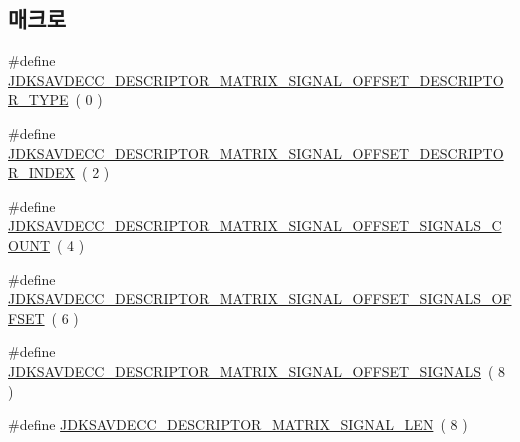 \subsection*{매크로}
\begin{DoxyCompactItemize}
\item 
\#define \hyperlink{group__descriptor__matrix__signal_ga83a98e456370c0fed71a54be9c65c89a}{J\+D\+K\+S\+A\+V\+D\+E\+C\+C\+\_\+\+D\+E\+S\+C\+R\+I\+P\+T\+O\+R\+\_\+\+M\+A\+T\+R\+I\+X\+\_\+\+S\+I\+G\+N\+A\+L\+\_\+\+O\+F\+F\+S\+E\+T\+\_\+\+D\+E\+S\+C\+R\+I\+P\+T\+O\+R\+\_\+\+T\+Y\+PE}~( 0 )
\item 
\#define \hyperlink{group__descriptor__matrix__signal_gad878b96f01d040970dd238c7bb1ecad5}{J\+D\+K\+S\+A\+V\+D\+E\+C\+C\+\_\+\+D\+E\+S\+C\+R\+I\+P\+T\+O\+R\+\_\+\+M\+A\+T\+R\+I\+X\+\_\+\+S\+I\+G\+N\+A\+L\+\_\+\+O\+F\+F\+S\+E\+T\+\_\+\+D\+E\+S\+C\+R\+I\+P\+T\+O\+R\+\_\+\+I\+N\+D\+EX}~( 2 )
\item 
\#define \hyperlink{group__descriptor__matrix__signal_gafe92108e812209dc99fffab8a2e98c45}{J\+D\+K\+S\+A\+V\+D\+E\+C\+C\+\_\+\+D\+E\+S\+C\+R\+I\+P\+T\+O\+R\+\_\+\+M\+A\+T\+R\+I\+X\+\_\+\+S\+I\+G\+N\+A\+L\+\_\+\+O\+F\+F\+S\+E\+T\+\_\+\+S\+I\+G\+N\+A\+L\+S\+\_\+\+C\+O\+U\+NT}~( 4 )
\item 
\#define \hyperlink{group__descriptor__matrix__signal_gafec84effd62a89a327a907773c36042d}{J\+D\+K\+S\+A\+V\+D\+E\+C\+C\+\_\+\+D\+E\+S\+C\+R\+I\+P\+T\+O\+R\+\_\+\+M\+A\+T\+R\+I\+X\+\_\+\+S\+I\+G\+N\+A\+L\+\_\+\+O\+F\+F\+S\+E\+T\+\_\+\+S\+I\+G\+N\+A\+L\+S\+\_\+\+O\+F\+F\+S\+ET}~( 6 )
\item 
\#define \hyperlink{group__descriptor__matrix__signal_gabd4a10b97a0e2c0361e38af083d066fa}{J\+D\+K\+S\+A\+V\+D\+E\+C\+C\+\_\+\+D\+E\+S\+C\+R\+I\+P\+T\+O\+R\+\_\+\+M\+A\+T\+R\+I\+X\+\_\+\+S\+I\+G\+N\+A\+L\+\_\+\+O\+F\+F\+S\+E\+T\+\_\+\+S\+I\+G\+N\+A\+LS}~( 8 )
\item 
\#define \hyperlink{group__descriptor__matrix__signal_ga590520dc48bf98bf3267e05a1f2cd374}{J\+D\+K\+S\+A\+V\+D\+E\+C\+C\+\_\+\+D\+E\+S\+C\+R\+I\+P\+T\+O\+R\+\_\+\+M\+A\+T\+R\+I\+X\+\_\+\+S\+I\+G\+N\+A\+L\+\_\+\+L\+EN}~( 8 )
\end{DoxyCompactItemize}
